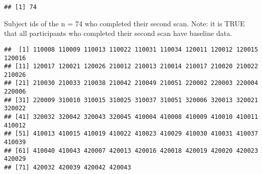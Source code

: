 \documentclass[]{article}
\newenvironment{Shaded}{\begin{snugshade}}{\end{snugshade}}
\newcommand{\KeywordTok}[1]{\textcolor[rgb]{0.13,0.29,0.53}{\textbf{#1}}}
\newcommand{\StringTok}[1]{\textcolor[rgb]{0.31,0.60,0.02}{#1}}
\newcommand{\CommentTok}[1]{\textcolor[rgb]{0.56,0.35,0.01}{\textit{#1}}}
\newcommand{\OperatorTok}[1]{\textcolor[rgb]{0.81,0.36,0.00}{\textbf{#1}}}
\newcommand{\NormalTok}[1]{#1}
\theoremstyle{definition}
\theoremstyle{definition}
\theoremstyle{definition}
\theoremstyle{remark}
\begin{document}
\begin{Shaded}
\end{Shaded}

\begin{verbatim}
## [1] 74
\end{verbatim}

Subject ids of the n = 74 who completed their second scan. Note: it is
TRUE that all participants who completed their second scan have baseline
data.

\begin{Shaded}
\end{Shaded}

\begin{verbatim}
##  [1] 110008 110009 110013 110022 110031 110034 120011 120012 120015 120016
## [11] 120017 120021 120026 210012 210013 210014 210017 210020 210022 210026
## [21] 210030 210033 210038 210042 210049 210051 220002 220003 220004 220006
## [31] 220009 310010 310015 310025 310037 310051 320006 320013 320021 320022
## [41] 320032 320042 320043 320045 410004 410008 410009 410010 410011 410012
## [51] 410013 410015 410019 410022 410023 410029 410030 410031 410037 410039
## [61] 410040 410043 420007 420013 420016 420018 420019 420020 420023 420029
## [71] 420032 420039 420042 420043
\end{verbatim}
\end{document}
